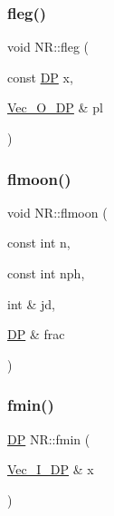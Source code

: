 \subsubsection{\texorpdfstring{fleg()}{fleg()}}
{\footnotesize\ttfamily void N\+R\+::fleg (\begin{DoxyParamCaption}\item[{const \mbox{\hyperlink{namespaceNR_af6ff762dd605ff477b8e52387253a02a}{DP}}}]{x,  }\item[{\mbox{\hyperlink{namespaceNR_a970094d23441f8ef6a45282a7eb2103d}{Vec\+\_\+\+O\+\_\+\+DP}} \&}]{pl }\end{DoxyParamCaption})}

\mbox{\label{namespaceNR_afd394882e21b8378572c186fb66220af}} 
\subsubsection{\texorpdfstring{flmoon()}{flmoon()}}
{\footnotesize\ttfamily void N\+R\+::flmoon (\begin{DoxyParamCaption}\item[{const int}]{n,  }\item[{const int}]{nph,  }\item[{int \&}]{jd,  }\item[{\mbox{\hyperlink{namespaceNR_af6ff762dd605ff477b8e52387253a02a}{DP}} \&}]{frac }\end{DoxyParamCaption})}

\mbox{\label{namespaceNR_a570c7b20deac021db5e798650ceb157f}} 
\subsubsection{\texorpdfstring{fmin()}{fmin()}}
{\footnotesize\ttfamily \mbox{\hyperlink{namespaceNR_af6ff762dd605ff477b8e52387253a02a}{DP}} N\+R\+::fmin (\begin{DoxyParamCaption}\item[{\mbox{\hyperlink{namespaceNR_a9f943da53862537c552e2a770cb170ae}{Vec\+\_\+\+I\+\_\+\+DP}} \&}]{x }\end{DoxyParamCaption})}

\mbox{\label{namespaceNR_aaff3ae4c060df78a4b5da02651af126d}} 
